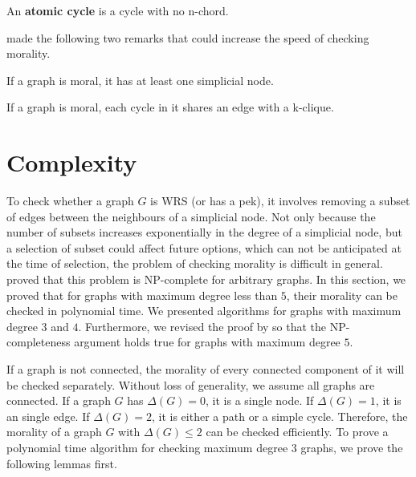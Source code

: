 \begin{definition}
An \textbf{atomic cycle} is a cycle with no n-chord. 
\end{definition}
\fi

\citeauthor{verma1993deciding}  made the following two remarks that could increase the speed of checking morality. 
\begin{remark}
If a graph is moral, it has at least one simplicial node. 
\end{remark}

\begin{remark}
If a graph is moral, each cycle in it shares an edge with a k-clique. 
\end{remark} 


\section{Complexity}
To check whether a graph $G$ is WRS (or has a pek), it involves removing a subset of edges between the neighbours of a simplicial node. Not only because the number of subsets increases exponentially in the degree of a simplicial node, but a selection of subset could affect future options, which can not be anticipated at the time of selection, the problem of checking morality is difficult in general. \citeauthor{verma1993deciding} proved that this problem is NP-complete for arbitrary graphs. In this section, we proved that for graphs with maximum degree less than $5$, their morality can be checked in polynomial time. We presented algorithms for graphs with maximum degree $3$ and $4$. Furthermore, we revised the proof by \citeauthor{verma1993deciding} so that the NP-completeness argument holds true for graphs with maximum degree $5$. 

If a graph is not connected, the morality of every connected component of it will be checked separately. Without loss of generality, we assume all graphs are connected. If a graph $G$ has $\Delta(G)=0$, it is a single node. If $\Delta(G)=1$, it is an single edge. If $\Delta(G)=2$, it is either a path or a simple cycle. Therefore, the morality of a graph $G$ with $\Delta(G)\le 2$ can be checked efficiently. To prove a polynomial time algorithm for checking maximum degree $3$ graphs, we prove the following lemmas first. 

